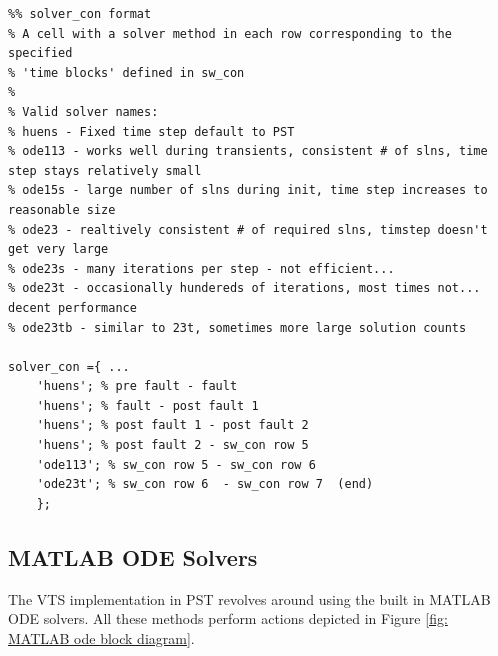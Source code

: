\begin{lstlisting}[caption={Solver Control Array Example},label={lst: solverCon ex}]
\end{lstlisting}\vspace{-2 em}
\begin{verbatim}
%% solver_con format
% A cell with a solver method in each row corresponding to the specified
% 'time blocks' defined in sw_con
%
% Valid solver names:
% huens - Fixed time step default to PST
% ode113 - works well during transients, consistent # of slns, time step stays relatively small
% ode15s - large number of slns during init, time step increases to reasonable size
% ode23 - realtively consistent # of required slns, timstep doesn't get very large
% ode23s - many iterations per step - not efficient...
% ode23t - occasionally hundereds of iterations, most times not... decent performance
% ode23tb - similar to 23t, sometimes more large solution counts

solver_con ={ ...
    'huens'; % pre fault - fault
    'huens'; % fault - post fault 1
    'huens'; % post fault 1 - post fault 2
    'huens'; % post fault 2 - sw_con row 5
    'ode113'; % sw_con row 5 - sw_con row 6 
    'ode23t'; % sw_con row 6  - sw_con row 7  (end)
    };
\end{verbatim}

\pagebreak
\subsection{MATLAB ODE Solvers}
The VTS implementation in PST revolves around using the built in MATLAB ODE solvers.
All these methods perform actions depicted in Figure \ref{fig: MATLAB ode block diagram}.

